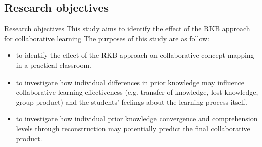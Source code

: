 \subsection{Research objectives}
\begin{frame}{Research objectives}
    This study aims to identify the effect of the RKB approach
    for collaborative learning
    The purposes of this study are as follow:
    \begin{itemize}
        \item <+-> to identify the effect of the RKB approach on collaborative 
              concept mapping in a practical classroom.
        \item <+-> to investigate how individual differences in prior knowledge 
              may influence collaborative-learning effectiveness 
              (e.g. transfer of knowledge, lost knowledge, group product) 
              and the students' feelings about the learning process itself. 
        \item <+-> to investigate how individual prior knowledge convergence and comprehension 
            levels through reconstruction may potentially predict the final 
            collaborative product. 
    \end{itemize} 
\end{frame}